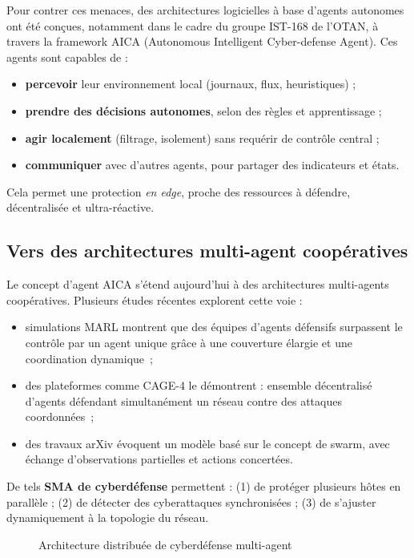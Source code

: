 \documentclass[ twoside,openright,titlepage,numbers=noenddot,headinclude,%
                footinclude=true,cleardoublepage=empty,abstractoff, %
                BCOR=5mm,paper=a4,fontsize=11pt,%
                french,american,%
                ]{scrreprt}
\begin{document}
Pour contrer ces menaces, des architectures logicielles à base d’agents autonomes ont été conçues, notamment dans le cadre du groupe IST-168 de l’OTAN, à travers la framework AICA (Autonomous Intelligent Cyber-defense Agent). Ces agents sont capables de :
\begin{itemize}
  \item \textbf{percevoir} leur environnement local (journaux, flux, heuristiques) ;
  \item \textbf{prendre des décisions autonomes}, selon des règles et apprentissage ;
  \item \textbf{agir localement} (filtrage, isolement) sans requérir de contrôle central ;
  \item \textbf{communiquer} avec d’autres agents, pour partager des indicateurs et états.
\end{itemize}
Cela permet une protection {\em en edge}, proche des ressources à défendre, décentralisée et ultra-réactive.

\subsection*{Vers des architectures multi-agent coopératives}

Le concept d’agent AICA s’étend aujourd’hui à des architectures multi-agents coopératives. Plusieurs études récentes explorent cette voie :
\begin{itemize}
  \item simulations MARL montrent que des équipes d’agents défensifs surpassent le contrôle par un agent unique grâce à une couverture élargie et une coordination dynamique~\cite{RLResilientCyberdefense2024};
  \item des plateformes comme CAGE-4 le démontrent : ensemble décentralisé d’agents défendant simultanément un réseau contre des attaques coordonnées~\cite{cage_challenge_3_announcement};
  \item des travaux arXiv évoquent un modèle basé sur le concept de swarm, avec échange d’observations partielles et actions concertées.
\end{itemize}
De tels \textbf{SMA de cyberdéfense} permettent : (1) de protéger plusieurs hôtes en parallèle ; (2) de détecter des cyberattaques synchronisées ; (3) de s’ajuster dynamiquement à la topologie du réseau.

\begin{figure}[h]
  \centering
  \caption{Architecture distribuée de cyberdéfense multi-agent}
  \label{fig:distributed_sma}
\end{figure}
\end{document}
